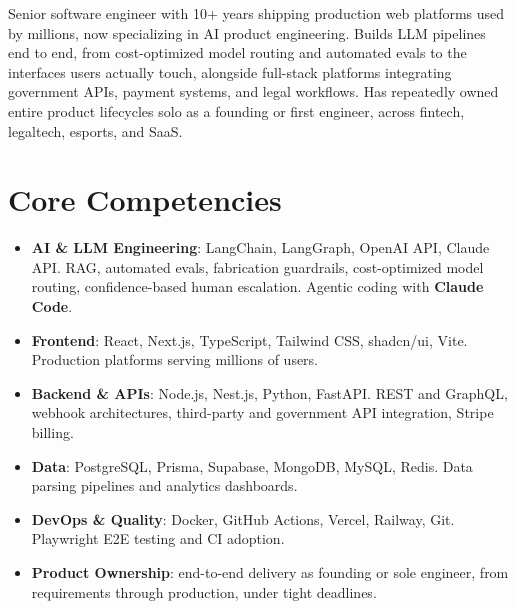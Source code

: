 \documentclass[11pt,a4paper,sans]{moderncv}
\begin{document}
\makecvtitle


\vspace{6pt}
\small{Senior software engineer with 10+ years shipping production web platforms used by millions,
now specializing in AI product engineering. Builds LLM pipelines end to end, from cost-optimized
model routing and automated evals to the interfaces users actually touch, alongside full-stack
platforms integrating government APIs, payment systems, and legal workflows. Has repeatedly owned
entire product lifecycles solo as a founding or first engineer, across fintech, legaltech, esports,
and SaaS.}


\section{Core Competencies}
\vspace{1pt}
\begin{itemize}

\item \textbf{AI \& LLM Engineering}: LangChain, LangGraph, OpenAI API, Claude API. RAG, automated
evals, fabrication guardrails, cost-optimized model routing, confidence-based human escalation.
Agentic coding with \textbf{Claude Code}.

\item \textbf{Frontend}: React, Next.js, TypeScript, Tailwind CSS, shadcn/ui, Vite. Production
platforms serving millions of users.

\item \textbf{Backend \& APIs}: Node.js, Nest.js, Python, FastAPI. REST and GraphQL, webhook
architectures, third-party and government API integration, Stripe billing.

\item \textbf{Data}: PostgreSQL, Prisma, Supabase, MongoDB, MySQL, Redis. Data parsing pipelines
and analytics dashboards.

\item \textbf{DevOps \& Quality}: Docker, GitHub Actions, Vercel, Railway, Git. Playwright E2E
testing and CI adoption.

\item \textbf{Product Ownership}: end-to-end delivery as founding or sole engineer, from
requirements through production, under tight deadlines.

\end{itemize}
\end{document}
